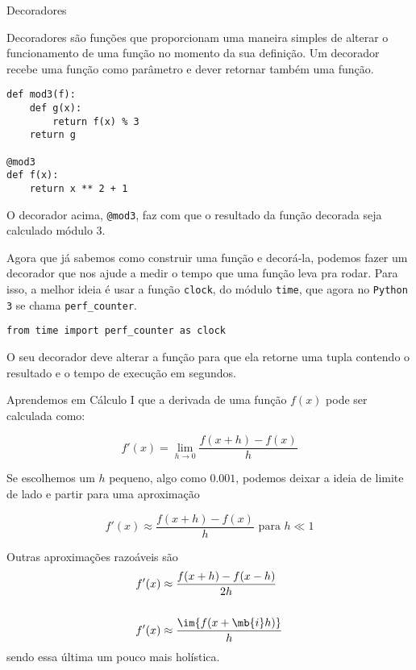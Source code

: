 	\begin{interlude}{Decoradores \label{i:decoradores}}
	
	Decoradores são funções que proporcionam uma maneira simples de alterar o funcionamento de uma função no momento da sua definição. Um decorador recebe uma função como parâmetro e dever retornar também uma função.
	
	\begin{lstlisting}
def mod3(f):
	def g(x):
		return f(x) % 3
	return g
	
@mod3
def f(x):
	return x ** 2 + 1
	\end{lstlisting}
	
	O decorador acima, \texttt{@mod3}, faz com que o resultado da função decorada seja calculado módulo 3.
	
	\end{interlude}
	
	
	Agora que já sabemos como construir uma função e decorá-la, podemos fazer um decorador que nos ajude a medir o tempo que uma função leva pra rodar. Para isso, a melhor ideia é usar a função \texttt{clock}, do módulo \texttt{time}, que agora no \texttt{Python 3} se chama \texttt{perf\_{}counter}.
	
	\begin{lstlisting}
from time import perf_counter as clock
	\end{lstlisting}
	
	\quest O seu decorador deve alterar a função para que ela retorne uma tupla contendo o resultado e o tempo de execução em segundos.
	
	
	Aprendemos em Cálculo I que a derivada de uma função $f(x)$ pode ser calculada como:
	
		$$f'(x) = \lim_{h \to 0} \frac{f(x + h) - f(x)}{h}$$
	
	Se escolhemos um $h$ pequeno, algo como $0.001$, podemos deixar a ideia de limite de lado e partir para uma aproximação
	
		$$f'(x) \approx \frac{f(x + h) - f(x)}{h} \text{ para } h \ll 1$$

	Outras aproximações razoáveis são	
		\begin{align*}
		f'(x) &\approx \frac{f(x + h) - f(x - h)}{2h}\\
		\\		
		f'(x) &\approx \frac{\im{f(x + \mb{i}h)}}{h} 
		\end{align*}	
	sendo essa última um pouco mais holística.\\
	

